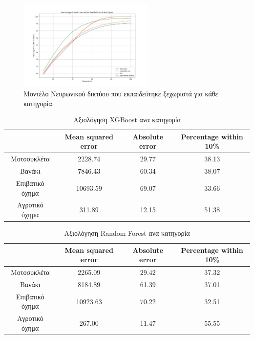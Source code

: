 \documentclass{llncs}
\begin{document}
\begin{figure}
    \begin{center}
        \includegraphics[width=0.6\textwidth]{images/individual_thresholds_neural.png}
    \end{center}
    \caption{Μοντέλο Νευρωνικού δικτύου που εκπαιδεύτηκε ξεχωριστά για κάθε κατηγορία}  
    \label{fig:neural_result_cat}  
\end{figure}

\begin{table}
    \centering
    \begin{tabular}{|c|c|c|c|} %
        \hline
         &Mean squared error & Absolute error & Percentage within 10\% \\ %
        \hline
        Μοτοσυκλέτα & 2228.74 & 29.77 & 38.13 \\
        Βανάκι & 7846.43 & 60.34 & 38.07 \\
        Επιβατικό όχημα & 10693.59 & 69.07 & 33.66 \\
        Αγροτικό όχημα & 311.89 & 12.15 & 51.38 \\
        \hline
    \end{tabular}
    \caption{Αξιολόγηση XGBoost ανα κατηγορία}
    \label{tab:XGBoost_cat_individual}
\end{table}

\begin{table}
    \centering
    \begin{tabular}{|c|c|c|c|} %
        \hline
         &Mean squared error & Absolute error & Percentage within 10\% \\ %
        \hline
        Μοτοσυκλέτα & 2265.09 & 29.42 & 37.32 \\
        Βανάκι & 8184.89 & 61.39 & 37.01 \\
        Επιβατικό όχημα & 10923.63 & 70.22 & 32.51 \\
        Αγροτικό όχημα & 267.00 & 11.47 & 55.55 \\
        \hline
    \end{tabular}
    \caption{Αξιολόγηση Random Forest ανα κατηγορία}
    \label{tab:RandomForest_cat_individual}
\end{table}
\end{document}
